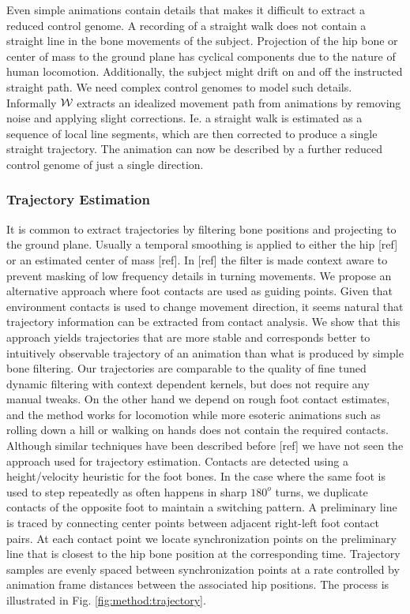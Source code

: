 Even simple animations contain details that makes it difficult to extract a reduced control genome. A recording of a straight walk does not contain a straight line in the bone movements of the subject. Projection of the hip bone or center of mass to the ground plane has cyclical components due to the nature of human locomotion. Additionally, the subject might drift on and off the instructed straight path. We need complex control genomes to model such details. 
Informally $\mathcal{W}$ extracts an idealized movement path from animations by removing noise and applying slight corrections. Ie. a straight walk is estimated as a sequence of local line segments, which are then corrected to produce a single straight trajectory. The animation can now be described by a further reduced control genome of just a single direction.

\subsubsection{\bf Trajectory Estimation}
It is common to extract trajectories by filtering bone positions and projecting to the ground plane. Usually a temporal smoothing is applied to either the hip [ref] or an estimated center of mass [ref]. In [ref] the filter is made context aware to prevent masking of low frequency details in turning movements. We propose an alternative approach where foot contacts are used as guiding points. Given that environment contacts is used to change movement direction, it seems natural that trajectory information can be extracted from contact analysis. We show that this approach yields trajectories that are more stable and corresponds better to intuitively observable trajectory of an animation than what is produced by simple bone filtering. Our trajectories are comparable to the quality of fine tuned dynamic filtering with context dependent kernels, but does not require any manual tweaks. On the other hand we depend on rough foot contact estimates, and the method works for locomotion while more esoteric animations such as rolling down a hill or walking on hands does not contain the required contacts.
%
Although similar techniques have been described before [ref] we have not seen the approach used for trajectory estimation.
Contacts are detected using a height/velocity heuristic for the foot bones. In the case where the same foot is used to step repeatedly as often happens in sharp $180^o$ turns, we duplicate contacts of the opposite foot to maintain a switching pattern. A preliminary line is traced by connecting center points between adjacent right-left foot contact pairs. At each contact point we locate synchronization points on the preliminary line that is closest to the hip bone position at the corresponding time. Trajectory samples are evenly spaced between synchronization points at a rate controlled by animation frame distances between the associated hip positions. The process is illustrated in Fig. \ref{fig:method:trajectory}. 
